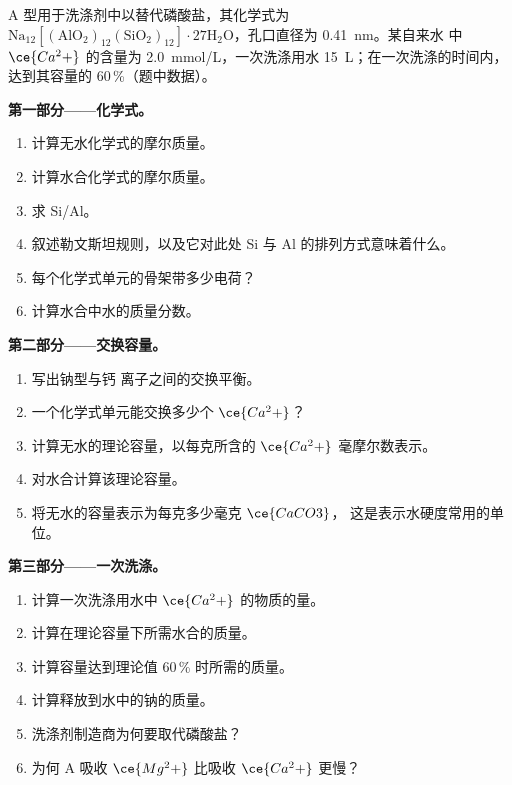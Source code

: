 \begin{problem}
\label{pb:b3:inorganic-materials:1}
A 型用于洗涤剂中以替代磷酸盐，其化学式为
$\mathrm{Na_{12}[(AlO_2)_{12}(SiO_2)_{12}]\cdot 27H_2O}$，孔口直径为 \qty{0.41}{nm}。某自来水
中 $\ce{Ca^2+}$ 的含量为 \qty{2.0}{mmol/L}，一次洗涤用水 \qty{15}{L}；在一次洗涤的时间内，
达到其容量的 60\,\%（题中数据）。

\medskip\noindent\textbf{第一部分——化学式。}
\begin{enumerate}
  \item 计算无水化学式的摩尔质量。
  \item 计算水合化学式的摩尔质量。
  \item 求 Si/Al。
  \item 叙述勒文斯坦规则，以及它对此处
        Si 与 Al 的排列方式意味着什么。
  \item 每个化学式单元的骨架带多少电荷？
  \item 计算水合中水的质量分数。
\end{enumerate}

\medskip\noindent\textbf{第二部分——交换容量。}
\begin{enumerate}[resume]
  \item 写出钠型与钙
        离子之间的交换平衡。
  \item 一个化学式单元能交换多少个 $\ce{Ca^2+}$？
  \item 计算无水的理论容量，以每克所含的 $\ce{Ca^2+}$
        毫摩尔数表示。
  \item 对水合计算该理论容量。
  \item 将无水的容量表示为每克多少毫克 $\ce{CaCO3}$，
        这是表示水硬度常用的单位。
\end{enumerate}

\medskip\noindent\textbf{第三部分——一次洗涤。}
\begin{enumerate}[resume]
  \item 计算一次洗涤用水中 $\ce{Ca^2+}$ 的物质的量。
  \item 计算在理论容量下所需水合的质量。
  \item 计算容量达到理论值 60\,\% 时所需的质量。
  \item 计算释放到水中的钠的质量。
  \item 洗涤剂制造商为何要取代磷酸盐？
  \item 为何 A 吸收 $\ce{Mg^2+}$ 比吸收 $\ce{Ca^2+}$ 更慢？
\end{enumerate}


\end{problem}
